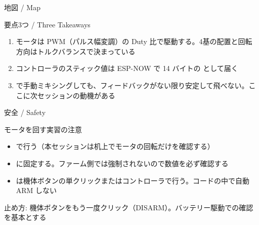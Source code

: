 
\begin{frame}{地図 / Map}
  \centering
  \vspace{-1mm}
\end{frame}

\begin{frame}{要点3つ / Three Takeaways}
  \begin{enumerate}
    \item モータは PWM（パルス幅変調）の Duty 比で駆動する。4基の配置と回転方向はトルクバランスで決まっている
    \item コントローラのスティック値は ESP-NOW で 14 バイトの  として届く
    \item {} で手動ミキシングしても、フィードバックがない限り安定して飛べない。ここに次セッションの動機がある
  \end{enumerate}
\end{frame}

\begin{frame}{安全 / Safety}
  \begin{alertblock}{モータを回す実習の注意}
    \begin{itemize}\small\setlength{\itemsep}{2pt}
      \item {}で行う（本セッションは机上でモータの回転だけを確認する）
      \item {}に固定する。ファーム側では強制されないので数値を必ず確認する
      \item {} は機体ボタンの単クリックまたはコントローラで行う。コードの中で自動 ARM しない
    \end{itemize}
  \end{alertblock}

  \vspace{0.5em}

  {\small 止め方: 機体ボタンをもう一度クリック（DISARM）。バッテリー駆動での確認を基本とする}
\end{frame}

